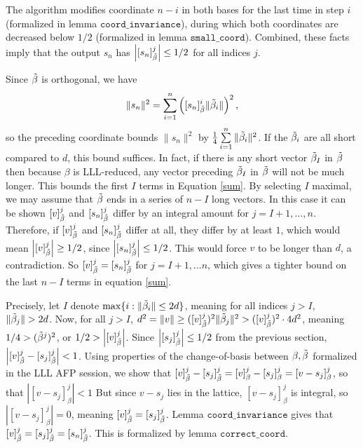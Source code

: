 \documentclass[11pt,a4paper]{article}
\begin{document}
The algorithm modifies coordinate $n-i$ in both bases for the last time in step $i$
(formalized in lemma $\mathtt{coord\_invariance}$), during which
both coordinates are decreased below $1/2$ (formalized in lemma $\mathtt{small\_coord}$). Combined, these facts
imply that the output $s_n$ has $\left|[s_n]_{\Tilde{\beta}}^j\right| \leq 1/2$ for all indices $j$.

Since $\Tilde{\beta}$ is orthogonal, we have \begin{equation}\|s_n\|^2=\sum\limits_{i=1}^n \left([s_n]_{\Tilde{\beta}}^i\|\Tilde{\beta}_i\|\right)^2 \label{sum}, \end{equation} so the preceding coordinate bounds $\|s_n\|^2$ by 
$\frac{1}{4}\sum\limits_{i=1}^n \|\Tilde{\beta}_i\|^2$. If the $\Tilde{\beta}_i$ are all short compared to $d$, this bound suffices. In fact, if there is any short vector $\Tilde{\beta}_I$ in $\Tilde{\beta}$ then because $\beta$ is LLL-reduced, any vector preceding $\Tilde{\beta}_I$ in $\Tilde{\beta}$ will not be much longer. This bounds the first $I$ terms in Equation \ref{sum}. By selecting $I$ maximal, we may assume that $\Tilde{\beta}$ ends in a series of $n-I$ long vectors. In this case it can be shown $[v]_{\Tilde{\beta}}^j$ and $[s_n]_{\Tilde{\beta}}^j$ differ by an integral amount for $j=I+1,...,n$. Therefore, if $[v]_{\Tilde{\beta}}^j$ and $[s_n]_{\Tilde{\beta}}^j$ differ at all, they differ by at least $1$, which would mean $\left|[v]_{\Tilde{\beta}}^j\right|\geq 1/2$, since $\left|[s_n]_{\Tilde{\beta}}^j\right|\leq 1/2$. This would force $v$ to be longer than $d$, a contradiction. So $[v]_{\Tilde{\beta}}^j=[s_n]_{\Tilde{\beta}}^j$ for $j=I+1,...n$, which gives a tighter bound on the last $n-I$ terms in equation \ref{sum}.

Precisely, let $I$ denote $\max\{i:\|\Tilde{\beta}_i\|\leq 2d\}$, meaning for all indices $j>I$,
$\|\Tilde{\beta}_j\|>2d$. Now, for all $j>I$, $d^2=\|v\|\geq ([v]_{\Tilde{\beta}}^j)^2 \|\Tilde{\beta}_j\|^2>([v]_{\Tilde{\beta}}^j)^2\cdot 4d^2$,
meaning $1/4>(\Tilde{\beta}^j)^2$, or $1/2>\left|[v]_{\Tilde{\beta}}^j\right|$.
Since $\left|[s_j]_{\Tilde{\beta}}^j\right|\leq 1/2$ from the previous section, 
$\left|[v]_{\Tilde{\beta}}^j- [s_j]_{\Tilde{\beta}}^j \right|<1$. Using properties of the
change-of-basis between $\beta,\Tilde{\beta}$ formalized in the LLL AFP session, we show that 
$[v]_{\Tilde{\beta}}^j-[s_j]_{\Tilde{\beta}}^j=[v]_{\beta}^j-[s_j]_{\beta}^j = [v-s_j]_{\beta}^j$,
so that $\left|[v-s_j]_{\beta}^j\right|<1$
But since $v-s_j$ lies in the lattice, $[v-s_j]_{\beta}^j$ is integral, so $\left|[v-s_j]_{\beta}^j\right|=0$,
meaning $[v]_{\Tilde{\beta}}^j = [s_j]_{\Tilde{\beta}}^j$. Lemma $\mathtt{coord\_invariance}$ gives that 
$[v]_{\Tilde{\beta}}^j=[s_j]_{\Tilde{\beta}}^j = [s_n]_{\Tilde{\beta}}^j$. This is formalized by lemma
$\mathtt{correct\_coord}$.
\end{document}
